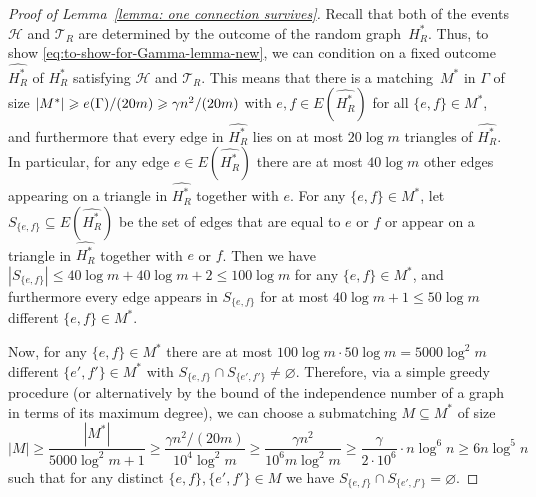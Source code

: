 \documentclass[11pt,reqno,oneside]{amsart}
\theoremstyle{definition}
\newcommand\wh[1]{\widehat{#1}}
\newcommand\1{\mathbf{1}}
\newcommand{\cH}{\mathcal{H}}
\DeclarePairedDelimiter{\paren}{\lparen}{\rparen}
\newcommand{\su}{\subseteq}
\let\leq\leqslant
\let\geq\geqslant
\begin{document}
\begin{proof}[Proof of Lemma~\ref{lemma: one connection survives}]
Recall that both of the events $\cH$ and $\mathcal T_R$ are determined by the outcome of the random graph~$H^*_R$. Thus, to show \cref{eq:to-show-for-Gamma-lemma-new}, we can condition on a fixed outcome $\wh{H^*_R}$ of $H^*_R$ satisfying $\cH$ and $\mathcal T_R$. This means that there is a matching~$M^*$ in $\Gamma$ of size $|M^*|\geq e\paren{\Gamma}/(20m)\geq \gamma n^2/(20m)$ with $e,f\in E(\wh{H^*_R})$ for all $\{e,f\}\in M^*$, and furthermore that every edge in $\wh{H^*_R}$ lies on at most $20\log m$ triangles of $\wh{H^*_R}$. In particular, for any edge $e\in E(\wh{H^*_R})$ there are at most $40\log m$ other edges appearing on a triangle in $\wh{H^*_R}$ together with $e$. For any $\{e,f\}\in M^*$, let $S_{\{e,f\}}\su E(\wh{H^*_R})$ be the set of edges that are equal to $e$ or $f$ or appear on a triangle in $\wh{H^*_R}$ together with $e$ or $f$. Then we have $|S_{\{e,f\}}|\leq 40\log m+40\log m+2\leq 100\log m$ for any $\{e,f\}\in M^*$, and furthermore every edge appears in $S_{\{e,f\}}$ for at most $40\log m+1\leq 50\log m$ different $\{e,f\}\in M^*$.

    Now, for any $\{e,f\}\in M^*$ there are at most $100\log m\cdot 50\log m= 5000\log^2m$ different $\{e',f'\}\in M^*$ with $S_{\{e,f\}}\cap S_{\{e',f'\}}\neq \varnothing$. Therefore, via a simple greedy procedure (or alternatively by the bound of the independence number of a graph in terms of its maximum degree), we can choose a submatching $M\su M^*$ of size
\[|M|\geq \frac{|M^*|}{5000\log^2m+1}\geq \frac{\gamma n^2/(20m)}{10^4\log^2m}\geq\frac{\gamma n^2}{10^6m\log ^2m}\geq \frac{\gamma}{2\cdot 10^6}\cdot n\log^6 n\geq 6n\log^5 n\]
such that for any distinct $\{e,f\},\{e',f'\}\in M$ we have $S_{\{e,f\}}\cap S_{\{e',f'\}}=\varnothing$.


\end{proof}
\end{document}
